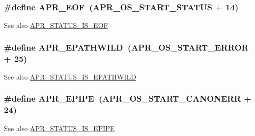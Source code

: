 \subsubsection[{\texorpdfstring{A\+P\+R\+\_\+\+E\+OF}{APR_EOF}}]{\setlength{\rightskip}{0pt plus 5cm}\#define A\+P\+R\+\_\+\+E\+OF~({\bf A\+P\+R\+\_\+\+O\+S\+\_\+\+S\+T\+A\+R\+T\+\_\+\+S\+T\+A\+T\+US} + 14)}\hypertarget{group___a_p_r___error_ga35d9dca2514c522a2840aca0f3e2ebd3}{}\label{group___a_p_r___error_ga35d9dca2514c522a2840aca0f3e2ebd3}
\begin{DoxySeeAlso}{See also}
\hyperlink{group___a_p_r___s_t_a_t_u_s___i_s_gafe2694daa9a7a2bbc6131f0c86216170}{A\+P\+R\+\_\+\+S\+T\+A\+T\+U\+S\+\_\+\+I\+S\+\_\+\+E\+OF} 
\end{DoxySeeAlso}
\subsubsection[{\texorpdfstring{A\+P\+R\+\_\+\+E\+P\+A\+T\+H\+W\+I\+LD}{APR_EPATHWILD}}]{\setlength{\rightskip}{0pt plus 5cm}\#define A\+P\+R\+\_\+\+E\+P\+A\+T\+H\+W\+I\+LD~({\bf A\+P\+R\+\_\+\+O\+S\+\_\+\+S\+T\+A\+R\+T\+\_\+\+E\+R\+R\+OR} + 25)}\hypertarget{group___a_p_r___error_ga01d0fb965051103b5c8f15a43ad2c767}{}\label{group___a_p_r___error_ga01d0fb965051103b5c8f15a43ad2c767}
\begin{DoxySeeAlso}{See also}
\hyperlink{group___a_p_r___s_t_a_t_u_s___i_s_ga0c03d168c48e10d037339f5073ee2c03}{A\+P\+R\+\_\+\+S\+T\+A\+T\+U\+S\+\_\+\+I\+S\+\_\+\+E\+P\+A\+T\+H\+W\+I\+LD} 
\end{DoxySeeAlso}
\subsubsection[{\texorpdfstring{A\+P\+R\+\_\+\+E\+P\+I\+PE}{APR_EPIPE}}]{\setlength{\rightskip}{0pt plus 5cm}\#define A\+P\+R\+\_\+\+E\+P\+I\+PE~({\bf A\+P\+R\+\_\+\+O\+S\+\_\+\+S\+T\+A\+R\+T\+\_\+\+C\+A\+N\+O\+N\+E\+RR} + 24)}\hypertarget{group___a_p_r___error_gae985330e30e374714ff1742485597f5d}{}\label{group___a_p_r___error_gae985330e30e374714ff1742485597f5d}
\begin{DoxySeeAlso}{See also}
\hyperlink{group___a_p_r___s_t_a_t_u_s___i_s_ga5f19f9dd7664901c2d2e59b6566abeb7}{A\+P\+R\+\_\+\+S\+T\+A\+T\+U\+S\+\_\+\+I\+S\+\_\+\+E\+P\+I\+PE} 
\end{DoxySeeAlso}
